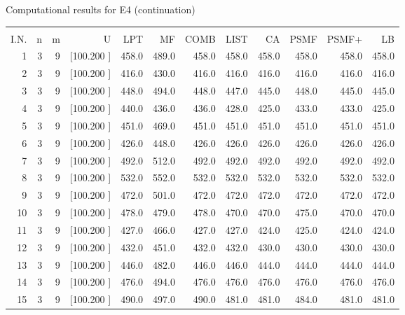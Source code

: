 \documentclass[12pt,a4paper]{article}
\begin{document}
\newpage
\begin{center}
 Computational results for E4 (continuation) {\tiny
\begin{tabular}{r r r r r r r r r r r r}\hline
    &   &   &          &        &        &        &        &        &        &        &       \\[-0.1in]
  I.N.  &  n  &  m  &  U  &  LPT  &  MF  &  COMB  &  LIST  &  CA  & PSMF &PSMF+ & LB \\[0.03in]
\hline
   1&  3&  9&[100.200   ]&   458.0&   489.0&   458.0&   458.0&   458.0&   458.0&   458.0&   458.0\\[-0.02in]
   2&  3&  9&[100.200   ]&   416.0&   430.0&   416.0&   416.0&   416.0&   416.0&   416.0&   416.0\\[-0.02in]
   3&  3&  9&[100.200   ]&   448.0&   494.0&   448.0&   447.0&   445.0&   448.0&   445.0&   445.0\\[-0.02in]
   4&  3&  9&[100.200   ]&   440.0&   436.0&   436.0&   428.0&   425.0&   433.0&   433.0&   425.0\\[-0.02in]
   5&  3&  9&[100.200   ]&   451.0&   469.0&   451.0&   451.0&   451.0&   451.0&   451.0&   451.0\\[-0.02in]
   6&  3&  9&[100.200   ]&   426.0&   448.0&   426.0&   426.0&   426.0&   426.0&   426.0&   426.0\\[-0.02in]
   7&  3&  9&[100.200   ]&   492.0&   512.0&   492.0&   492.0&   492.0&   492.0&   492.0&   492.0\\[-0.02in]
   8&  3&  9&[100.200   ]&   532.0&   552.0&   532.0&   532.0&   532.0&   532.0&   532.0&   532.0\\[-0.02in]
   9&  3&  9&[100.200   ]&   472.0&   501.0&   472.0&   472.0&   472.0&   472.0&   472.0&   472.0\\[-0.02in]
  10&  3&  9&[100.200   ]&   478.0&   479.0&   478.0&   470.0&   470.0&   475.0&   470.0&   470.0\\[-0.02in]
  11&  3&  9&[100.200   ]&   427.0&   466.0&   427.0&   427.0&   424.0&   425.0&   424.0&   424.0\\[-0.02in]
  12&  3&  9&[100.200   ]&   432.0&   451.0&   432.0&   432.0&   430.0&   430.0&   430.0&   430.0\\[-0.02in]
  13&  3&  9&[100.200   ]&   446.0&   482.0&   446.0&   446.0&   444.0&   444.0&   444.0&   444.0\\[-0.02in]
  14&  3&  9&[100.200   ]&   476.0&   494.0&   476.0&   476.0&   476.0&   476.0&   476.0&   476.0\\[-0.02in]
  15&  3&  9&[100.200   ]&   490.0&   497.0&   490.0&   481.0&   481.0&   484.0&   481.0&   481.0\\[-0.02in]

\end{tabular}}
\end{center}
\end{document}
